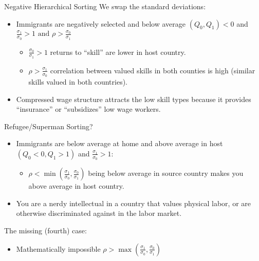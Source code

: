 \documentclass[aspectratio=169,11pt]{beamer}
\begin{document}
\begin{frame}{Negative Hierarchical Sorting}
We swap the standard deviations:
\begin{itemize}
\item Immigrants are negatively selected and below average $(Q_0,Q_1) < 0$ and $\frac{\sigma_{1}}{\sigma_{0}}>1 \text { and } \rho>\frac{\sigma_{0}}{\sigma_{1}}$
\begin{itemize}
\item $\frac{\sigma_{0}}{\sigma_{1}}>1$ returns to ``skill'' are lower in host country.
\item $\rho>\frac{\sigma_{1}}{\sigma_{0}}$ correlation between valued skills in both counties is high (similar skills valued in both countries).
\end{itemize}
\item Compressed wage structure attracts the low skill types because it provides ``insurance'' or ``subsidizes'' low wage workers.
\end{itemize}
\end{frame}

\begin{frame}{Refugee/Superman Sorting?}
\begin{itemize}
\item Immigrants are below average at home and above average in host $(Q_0<0 ,Q_1>1)$ and $\frac{\sigma_{1}}{\sigma_{0}}>1$:
\begin{itemize}
\item $\rho<\min \left(\frac{\sigma_{1}}{\sigma_{0}}, \frac{\sigma_{0}}{\sigma_{1}}\right)$ being below average in source country makes you above average in host country.
\end{itemize}
\item You are a nerdy intellectual in a country that values physical labor, or are otherwise discriminated against in the labor market.
\end{itemize}
The missing (fourth) case:
\begin{itemize}
\item Mathematically impossible $\rho>\max \left(\frac{\sigma_{1}}{\sigma_{0}}, \frac{\sigma_{0}}{\sigma_{1}}\right)$
\end{itemize}
\end{frame}
\end{document}
